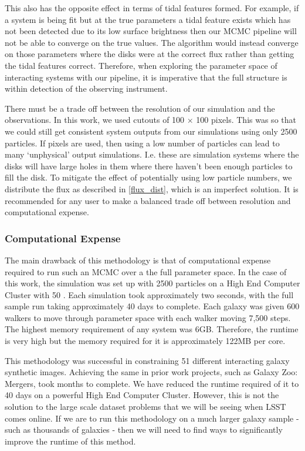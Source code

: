 This also has the opposite effect in terms of tidal features formed. For example, if a system is being fit but at the true parameters a tidal feature exists which has not been detected due to its low surface brightness then our MCMC pipeline will not be able to converge on the true values. The algorithm would instead converge on those parameters where the disks were at the correct flux rather than getting the tidal features correct. Therefore, when exploring the parameter space of interacting systems with our pipeline, it is imperative that the full structure is within detection of the observing instrument.

There must be a trade off between the resolution of our simulation and the observations. In this work, we used cutouts of 100 $\times$ 100 pixels. This was so that we could still get consistent system outputs from our simulations using only 2500 particles. If \DIFdelbegin {}\DIFdelend \DIFaddbegin {}\DIFaddend pixels are used, then using a low number of particles can lead to many `unphysical' output simulations. I.e. these are simulation systems where the disks will have large holes in them where there haven't been enough particles to fill the disk. To mitigate the effect of potentially using low particle numbers, we distribute the flux as described in \DIFdelbegin {}\DIFdelend \DIFaddbegin {}\DIFaddend \ref{flux_dist}, which is an imperfect solution. It is recommended for any user to make a balanced trade off between resolution and computational expense.

\subsubsection{Computational Expense}\label{computational_expense}
\noindent The main drawback of this methodology is that of computational expense required to run such an MCMC over a the full parameter space. In the case of this work, the simulation was set up with 2500 particles on a High End Computer Cluster with 50 \DIFdelbegin {}\DIFdelend \DIFaddbegin {}\DIFaddend . Each simulation took approximately two seconds, with the full sample run taking approximately 40 days to complete. Each galaxy was given 600 walkers to move through parameter space with each walker moving 7,500 steps. The highest memory requirement of any system was 6GB. Therefore, the runtime is very high but the memory required for it is approximately 122MB per core.

This methodology was successful in constraining 51 different interacting galaxy synthetic images. Achieving the same in prior work projects, such as Galaxy Zoo: Mergers, took months to complete. We have reduced the runtime required of it to 40 days on a powerful High End Computer Cluster. However, this is not the solution to the large scale dataset problems that we will be seeing when LSST comes online. If we are to run this methodology on a much larger galaxy sample - such as thousands of galaxies - then we will need to find ways to significantly improve the runtime of this method.

